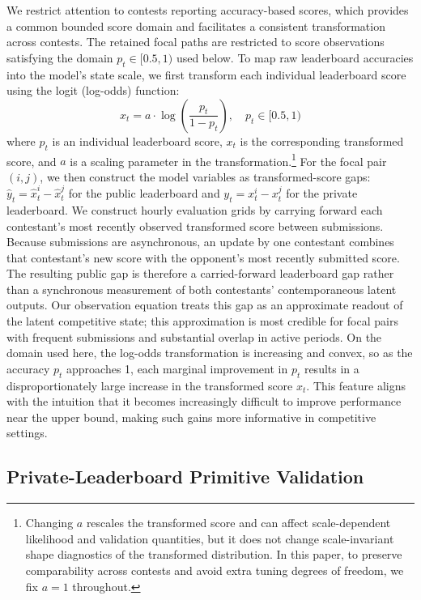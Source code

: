 \documentclass[mnsc]{informs3}
\begin{document}
We restrict attention to contests reporting accuracy-based scores, which provides a common bounded score domain and facilitates a consistent transformation across contests.
The retained focal paths are restricted to score observations satisfying the domain $p_t\in[0.5,1)$ used below.
To map raw leaderboard accuracies into the model's state scale, we first transform each individual leaderboard score using the logit (log-odds) function:
\begin{equation}\label{eq-leaderboard-transform}
x_t = a \cdot \log\left(\frac{p_t}{1-p_t}\right), \quad p_t\in[0.5,1)
\end{equation}
where $p_t$ is an individual leaderboard score, $x_t$ is the corresponding transformed score, and $a$ is a scaling parameter in the transformation.\footnote{
Changing $a$ rescales the transformed score and can affect scale-dependent likelihood and validation quantities, but it does not change scale-invariant shape diagnostics of the transformed distribution.
In this paper, to preserve comparability across contests and avoid extra tuning degrees of freedom, we fix $a=1$ throughout.
}
For the focal pair $(i,j)$, we then construct the model variables as transformed-score gaps: $\hat y_t=\hat x_t^i-\hat x_t^j$ for the public leaderboard and $y_t=x_t^i-x_t^j$ for the private leaderboard.
We construct hourly evaluation grids by carrying forward each contestant's most recently observed transformed score between submissions.
Because submissions are asynchronous, an update by one contestant combines that contestant's new score with the opponent's most recently submitted score. The resulting public gap is therefore a carried-forward leaderboard gap rather than a synchronous measurement of both contestants' contemporaneous latent outputs. Our observation equation treats this gap as an approximate readout of the latent competitive state; this approximation is most credible for focal pairs with frequent submissions and substantial overlap in active periods.
On the domain used here, the log-odds transformation is increasing and convex, so as the accuracy $p_t$ approaches 1, each marginal improvement in $p_t$ results in a disproportionately large increase in the transformed score $x_t$.
This feature aligns with the intuition that it becomes increasingly difficult to improve performance near the upper bound, making such gains more informative in competitive settings.


\subsection{Private-Leaderboard Primitive Validation}\label{sect-validation}
\end{document}
